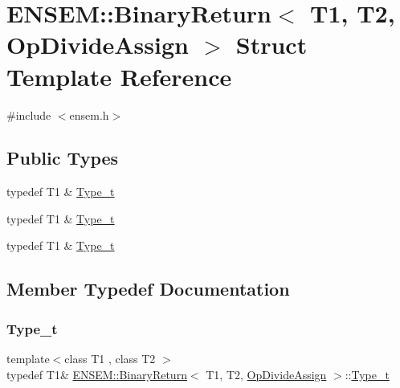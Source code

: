 \hypertarget{structENSEM_1_1BinaryReturn_3_01T1_00_01T2_00_01OpDivideAssign_01_4}{}\section{E\+N\+S\+EM\+:\+:Binary\+Return$<$ T1, T2, Op\+Divide\+Assign $>$ Struct Template Reference}
\label{structENSEM_1_1BinaryReturn_3_01T1_00_01T2_00_01OpDivideAssign_01_4}


{\ttfamily \#include $<$ensem.\+h$>$}

\subsection*{Public Types}
\begin{DoxyCompactItemize}
\item 
typedef T1 \& \mbox{\hyperlink{structENSEM_1_1BinaryReturn_3_01T1_00_01T2_00_01OpDivideAssign_01_4_a02fea7e2c56cca02f54cf841a28052d3}{Type\+\_\+t}}
\item 
typedef T1 \& \mbox{\hyperlink{structENSEM_1_1BinaryReturn_3_01T1_00_01T2_00_01OpDivideAssign_01_4_a02fea7e2c56cca02f54cf841a28052d3}{Type\+\_\+t}}
\item 
typedef T1 \& \mbox{\hyperlink{structENSEM_1_1BinaryReturn_3_01T1_00_01T2_00_01OpDivideAssign_01_4_a02fea7e2c56cca02f54cf841a28052d3}{Type\+\_\+t}}
\end{DoxyCompactItemize}


\subsection{Member Typedef Documentation}
\mbox{\label{structENSEM_1_1BinaryReturn_3_01T1_00_01T2_00_01OpDivideAssign_01_4_a02fea7e2c56cca02f54cf841a28052d3}} 
\subsubsection{\texorpdfstring{Type\_t}{Type\_t}\hspace{0.1cm}{\footnotesize\ttfamily [1/3]}}
{\footnotesize\ttfamily template$<$class T1 , class T2 $>$ \\
typedef T1\& \mbox{\hyperlink{structENSEM_1_1BinaryReturn}{E\+N\+S\+E\+M\+::\+Binary\+Return}}$<$ T1, T2, \mbox{\hyperlink{structENSEM_1_1OpDivideAssign}{Op\+Divide\+Assign}} $>$\+::\mbox{\hyperlink{structENSEM_1_1BinaryReturn_3_01T1_00_01T2_00_01OpDivideAssign_01_4_a02fea7e2c56cca02f54cf841a28052d3}{Type\+\_\+t}}}

